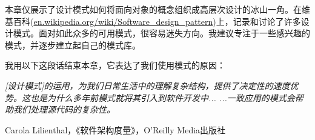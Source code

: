 

本章仅展示了设计模式如何将面向对象的概念组织成高层次设计的冰山一角。在维基百科(\url{en.wikipedia.org/wiki/Software_design_pattern})上，记录和讨论了许多设计模式。面对如此众多的可用模式，很容易迷失方向。我建议专注于一些感兴趣的模式，并逐步建立起自己的模式库。

我用以下这段话结束本章，它表达了我们使用模式的原因：

\textit{
[设计模式]的运用，为我们日常生活中的理解复杂结构，提供了决定性的速度优势。这也是为什么多年前模式就将其引入到软件开发中... ...一致应用的模式会帮助我们处理源代码的复杂性。
}

\begin{flushright}
Carola Lilienthal，《软件架构度量》，O'Reilly Media出版社
\end{flushright}
